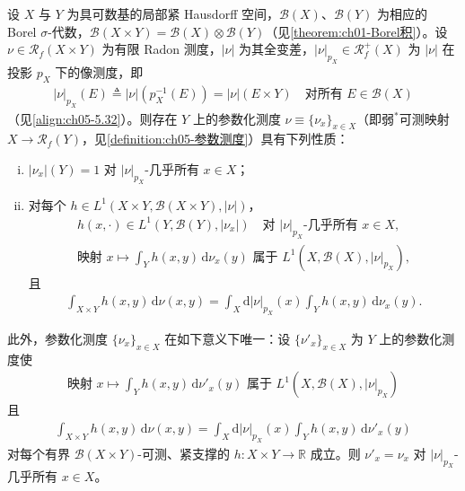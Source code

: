 \documentclass[../../main.tex]{subfiles}%
\begin{document}
\begin{theorem}[离散分解]\label{theorem:ch05-离散分解}
设 $X$ 与 $Y$ 为具可数基的局部紧 Hausdorff 空间，$\mathscr{B}(X)$、$\mathscr{B}(Y)$ 为相应的 Borel $\sigma$-代数，$\mathscr{B}(X\times Y)=\mathscr{B}(X)\otimes\mathscr{B}(Y)$（见\cref{theorem:ch01-Borel积}）。设 $\nu\in\mathscr{R}_f(X\times Y)$ 为有限 Radon 测度，$|\nu|$ 为其全变差，$|\nu|_{p_X}\in\mathscr{R}^+_f(X)$ 为 $|\nu|$ 在投影 $p_X$ 下的像测度，即
\begin{align*}
|\nu|_{p_X}(E)\triangleq |\nu|(p_X^{-1}(E))=|\nu|(E\times Y)
\quad\text{对所有 }E\in\mathscr{B}(X)
\end{align*}
（见\eqref{align:ch05-5.32}）。则存在 $Y$ 上的参数化测度 $\nu\equiv\{\nu_x\}_{x\in X}$（即弱$^*$可测映射 $X\to\mathscr{R}_f(Y)$，见\cref{definition:ch05-参数测度}）具有下列性质：
\begin{enumerate}[(i)]
\item\label{item:ch05-dis-i} $|\nu_x|(Y)=1$ 对 $|\nu|_{p_X}$-几乎所有 $x\in X$；
\item\label{item:ch05-dis-ii} 对每个 $h\in L^1(X\times Y,\mathscr{B}(X\times Y),|\nu|)$，
\begin{align}
h(x,\cdot)\in L^1(Y,\mathscr{B}(Y),|\nu_x|)
\quad\text{对 }|\nu|_{p_X}\text{-几乎所有 }x\in X,\label{align:ch05-5.34}\\
\text{映射 }x\mapsto\int_Y h(x,y)\,\mathrm{d}\nu_x(y)
\text{ 属于 }L^1(X,\mathscr{B}(X),|\nu|_{p_X}),\label{align:ch05-5.35}
\end{align}
且
\begin{align}
\int_{X\times Y}h(x,y)\,\mathrm{d}\nu(x,y)
=\int_X\mathrm{d}|\nu|_{p_X}(x)\int_Y h(x,y)\,\mathrm{d}\nu_x(y).\label{align:ch05-5.36}
\end{align}
\end{enumerate}
此外，参数化测度 $\{\nu_x\}_{x\in X}$ 在如下意义下唯一：设 $\{\nu'_x\}_{x\in X}$ 为 $Y$ 上的参数化测度使
\begin{align}
\text{映射 }x\mapsto\int_Y h(x,y)\,\mathrm{d}\nu'_x(y)
\text{ 属于 }L^1(X,\mathscr{B}(X),|\nu|_{p_X})\label{align:ch05-5.37}
\end{align}
且
\begin{align}
\int_{X\times Y}h(x,y)\,\mathrm{d}\nu(x,y)
=\int_X\mathrm{d}|\nu|_{p_X}(x)\int_Y h(x,y)\,\mathrm{d}\nu'_x(y)\label{align:ch05-5.38}
\end{align}
对每个有界 $\mathscr{B}(X\times Y)$-可测、紧支撑的 $h:X\times Y\to\mathbb{R}$ 成立。则 $\nu'_x=\nu_x$ 对 $|\nu|_{p_X}$-几乎所有 $x\in X$。
\end{theorem}
\end{document}
